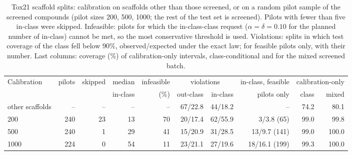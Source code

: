 \begin{table}[ht]
\centering
\caption{Tox21 scaffold splits: calibration on scaffolds other than those screened, or on a random pilot sample of the screened compounds (pilot sizes 200, 500, 1000; the rest of the test set is screened). Pilots with fewer than five in-class were skipped. Infeasible: pilots for which the in-class-class request ($\alpha=\delta=0.10$ for the planned number of in-class) cannot be met, so the most conservative threshold is used. Violations: splits in which test coverage of the class fell below 90\%, observed/expected under the exact law; for feasible pilots only, with their number. Last columns: coverage (\%) of calibration-only intervals, class-conditional and for the mixed screened batch.}
\label{tab:pilots}
\small
\begin{tabular}{lrrrrrrrrr}
\toprule
Calibration & pilots & skipped & median & infeasible & \multicolumn{2}{c}{violations} & in-class, feasible & \multicolumn{2}{c}{calibration-only} \\
 & & & in-class & (\%) & out-class & in-class & pilots only & class & mixed \\
\midrule
other scaffolds & -- & -- & -- & -- & 67/22.8 & 44/18.2 & -- & 74.2 & 80.1 \\
200 & 240 & 23 & 13 & 70 & 20/17.4 & 62/55.9 & 3/3.8 (65) & 99.0 & 99.8 \\
500 & 240 & 1 & 29 & 41 & 15/20.9 & 31/28.5 & 13/9.7 (141) & 99.0 & 100.0 \\
1000 & 224 & 0 & 54 & 11 & 23/21.1 & 27/19.6 & 18/16.1 (199) & 99.3 & 100.0 \\
\bottomrule
\end{tabular}
\end{table}
